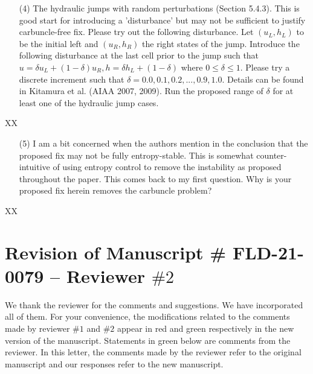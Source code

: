 \documentclass[english,11pt]{article}
\begin{document}
\bigskip
{\color{red}
  \begin{itemize}
  \item[(4)]
    The hydraulic jumps with random perturbations (Section 5.4.3). This is good start for introducing a
    'disturbance' but may not be sufficient to justify carbuncle-free fix. Please try out the following
    disturbance. Let $(u_L, h_L)$ to be the initial left and $(u_R, h_R)$ the right states of the jump. 
    Introduce the following disturbance at the last cell prior to the jump such that 
    $u=\delta { u_L} + (1-\delta)u_R, h=\delta {h_L} + (1-\delta)$ where $0\leq{\delta}\leq{1}$. 
    Please try a discrete increment such that $\delta = 0.0, 0.1, 0.2,...,0.9, 1.0$. 
    Details can be found in Kitamura et al. (AIAA 2007, 2009). Run the proposed range of $\delta$
    for at least one of the hydraulic jump cases.
  \end{itemize}
}
\noindent
XX

\bigskip
{\color{red}
  \begin{itemize}
  \item[(5)]
    I am a bit concerned when the authors mention in the conclusion that the proposed fix may not be fully
    entropy-stable. This is somewhat counter-intuitive of using entropy control to remove the instability as
    proposed throughout the paper. This comes back to my first question. Why is your proposed fix herein
    removes the carbuncle problem?
  \end{itemize}
}
\noindent
XX

%
%
%
%

\newpage
\section*{Revision of Manuscript \# FLD-21-0079 -- Reviewer $\#2$}
We thank the reviewer for the comments and suggestions.
We have incorporated all of them.  For your convenience,
the modifications related to the comments made by reviewer $\#1$ and $\#2$
appear in red and green respectively in the new version of the manuscript.
Statements in green below are comments from the reviewer.
In this letter, the comments made by the reviewer refer to the original
manuscript and our responses refer to the new manuscript.
\end{document}
